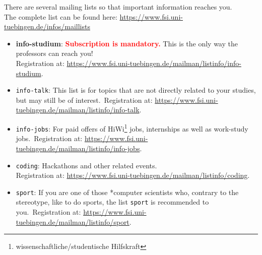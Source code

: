 There are several mailing lists so that important information reaches you.\\
The complete list can be found here: \url{https://www.fsi.uni-tuebingen.de/infos/maillists}
\begin{itemize}
	\item \textbf{info-studium}: \textcolor{red}{\textbf{Subscription is mandatory.}} This is the only way the professors can reach you! \\
	Registration at: \url{https://www.fsi.uni-tuebingen.de/mailman/listinfo/info-studium}.
	\item \texttt{info-talk}: This list is for topics that are not directly related to your studies, but may still be of interest.\
	Registration at: \url{https://www.fsi.uni-tuebingen.de/mailman/listinfo/info-talk}.
	\item \texttt{info-jobs}: For paid offers of HiWi\footnote{wissenschaftliche/studentische Hilfskraft} jobs, internships as well as work-study jobs.\
	Registration at: \url{https://www.fsi.uni-tuebingen.de/mailman/listinfo/info-jobs}.
	\item \texttt{coding}: Hackathons and other related events.\\
	Registration at: \url{https://www.fsi.uni-tuebingen.de/mailman/listinfo/coding}.
	\item \texttt{sport}: If you are one of those *computer scientists who, contrary to the stereotype, like to do sports, the list \texttt{sport} is recommended to you.\
	Registration at: \url{https://www.fsi.uni-tuebingen.de/mailman/listinfo/sport}. 
\end{itemize}
